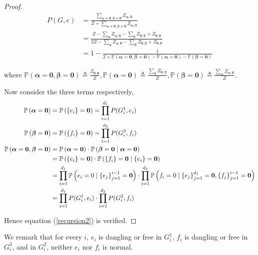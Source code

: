 \begin{proof}

	\begin{align*}
P(G,e) &= \frac{\sum_{\boldsymbol\alpha \neq \mathbf{0}, \boldsymbol\beta \neq \mathbf{0}} Z_{\boldsymbol\alpha, \boldsymbol\beta}}{Z + \sum_{\boldsymbol\alpha \neq \mathbf{0}, \boldsymbol\beta \neq \mathbf{0}} Z_{\boldsymbol\alpha, \boldsymbol\beta}} \\
&=\frac{Z - \sum_{\boldsymbol\alpha}Z_{\boldsymbol\alpha,\mathbf{0}} - \sum_{\boldsymbol\beta} Z_{\mathbf{0}, \boldsymbol\beta} + Z_{\mathbf{0}, \mathbf{0}}}{2Z - \sum_{\boldsymbol\alpha}Z_{\boldsymbol\alpha,\mathbf{0}} - \sum_{\boldsymbol\beta} Z_{\mathbf{0}, \boldsymbol\beta} + Z_{\mathbf{0}, \mathbf{0}}} \\
&= 1 - \frac{1}{2 + \mathbb{P}\left( \boldsymbol\alpha = \mathbf{0}, \boldsymbol\beta = \mathbf{0} \right) - \mathbb{P} \left( \boldsymbol\alpha = \mathbf{0} \right) - \mathbb{P} \left( \boldsymbol\beta = \mathbf{0} \right)}
	\end{align*}

	where $\mathbb{P} \left( \boldsymbol\alpha = \mathbf{0}, \boldsymbol\beta = \mathbf{0} \right) \triangleq \frac{Z_{\mathbf{0},\mathbf{0}}}{Z}, \mathbb{P} \left( \boldsymbol\alpha = \mathbf{0} \right) \triangleq \frac{\sum_{\boldsymbol\beta} Z_{\mathbf{0}, \boldsymbol\beta} }{Z}, \mathbb{P} \left( \boldsymbol\beta = \mathbf{0} \right) \triangleq \frac{\sum_{\boldsymbol\alpha} Z_{ \boldsymbol\alpha , \mathbf{0}} }{Z}$.

Now consider the three terms respectively,
	\begin{align*}
		\mathbb{P}\left( \boldsymbol\alpha = \mathbf{0}\right) &= \mathbb{P} \left( \left\{e_i\right\} = \mathbf{0}\right) =	\prod_{i=1}^{d_1} P(G_i^1, e_i) \\
		\mathbb{P}\left( \boldsymbol\beta = \mathbf{0}\right) &= \mathbb{P} \left( \left\{f_i\right\} = \mathbf{0}\right) =	\prod_{i=1}^{d_2} P(G_i^3, f_i) \\
		\mathbb{P}\left( \boldsymbol\alpha = \mathbf{0}, \boldsymbol\beta = \mathbf{0} \right) &=  \mathbb{P} \left( \boldsymbol\alpha = \mathbf{0} \right) \cdot \mathbb{P}\left( \boldsymbol\beta = \mathbf{0} \mid \boldsymbol\alpha = \mathbf{0} \right) \\
		&=  \mathbb{P} \left( \left\{e_i\right\} = \mathbf{0}\right) \cdot \mathbb{P} \left( \left\{f_i\right\} = \mathbf{0} \mid \left\{e_i\right\} = \mathbf{0} \right) \\
		&= \prod_{i=1}^{d_1} \mathbb{P} \left( e_i = 0 \mid \left\{e_j\right\}_{j=1}^{i-1} = \mathbf{0} \right) \cdot \prod_{i=1}^{d_2} \mathbb{P} \left( f_i = 0 \mid \left\{e_j\right\}_{j=1}^{d_1} = \mathbf{0},\left\{f_j\right\}_{j=1}^{i-1} = \mathbf{0} \right) \\
		&= \prod_{i=1}^{d_1} P(G_i^1, e_i) \cdot \prod_{i=1}^{d_2} P(G_i^2, f_i)
	\end{align*}

	Hence equation (\ref{recursion2}) is verified.
\end{proof}

We remark that for every $i$, $e_i$ is dangling or free in $G_i^1$, $f_i$ is dangling or free in $G_i^3$, and in $G_i^2$, neither $e_i$ nor $f_i$ is normal.


